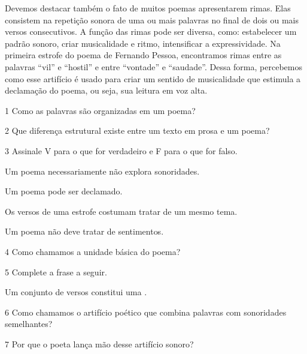 {Devemos destacar também o fato de muitos poemas apresentarem rimas. Elas
consistem na repetição sonora de uma ou mais palavras no final de dois
ou mais versos consecutivos. A função das rimas pode ser diversa, como:
estabelecer um padrão sonoro, criar musicalidade e ritmo, intensificar a
expressividade. Na primeira estrofe do poema de Fernando
Pessoa, encontramos rimas entre as palavras “vil” e “hostil” e entre “vontade”
e “saudade”. Dessa forma, percebemos como esse artifício é usado
para criar um sentido de musicalidade que estimula a declamação do
poema, ou seja, sua leitura em voz alta.}


\num{1} Como as palavras são organizadas em um poema?


\num{2} Que diferença estrutural existe entre um texto em prosa e um poema?


\num{3} Assinale V para o que for verdadeiro e F para o que for falso.

\begin{boxlist}
 Um poema necessariamente não explora sonoridades.

 Um poema pode ser declamado.

 Os versos de uma estrofe costumam tratar de um mesmo tema.

 Um poema não deve tratar de sentimentos.
\end{boxlist}

\num{4} Como chamamos a unidade básica do poema?


\num{5} Complete a frase a seguir.

Um conjunto de versos constitui uma .

\num{6} Como chamamos o artifício poético que combina palavras com
sonoridades semelhantes?



\num{7} Por que o poeta lança mão desse artifício sonoro?

